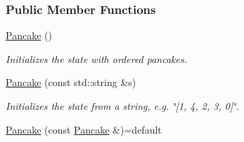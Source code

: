 \subsubsection*{Public Member Functions}
\begin{DoxyCompactItemize}
\item 
\hyperlink{structpancake_1_1Pancake_ac4faa485605586630ce98f16a2331070}{Pancake} ()\hypertarget{structpancake_1_1Pancake_ac4faa485605586630ce98f16a2331070}{}\label{structpancake_1_1Pancake_ac4faa485605586630ce98f16a2331070}

\begin{DoxyCompactList}\small\item\em Initializes the state with ordered pancakes. \end{DoxyCompactList}\item 
\hyperlink{structpancake_1_1Pancake_a656a725c61a796487acb59cd430a9e45}{Pancake} (const std\+::string \&s)
\begin{DoxyCompactList}\small\item\em Initializes the state from a string, e.\+g. \char`\"{}\mbox{[}1, 4, 2, 3, 0\mbox{]}\char`\"{}. \end{DoxyCompactList}\item 
\hyperlink{structpancake_1_1Pancake_a7b99f7a721cdf79fc93f0050e035d1ac}{Pancake} (const \hyperlink{structpancake_1_1Pancake}{Pancake} \&)=default\hypertarget{structpancake_1_1Pancake_a7b99f7a721cdf79fc93f0050e035d1ac}{}\label{structpancake_1_1Pancake_a7b99f7a721cdf79fc93f0050e035d1ac}


\end{DoxyCompactItemize}
